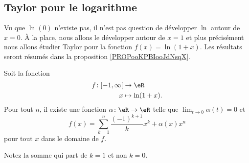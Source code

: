 \subsection{Taylor pour le logarithme}

Vu que \( \ln(0)\) n'existe pas, il n'est pas question de développer \( \ln\) autour de \( x=0\). À la place, nous allons le développer autour de \( x=1\) et plus précisément nous allons étudier Taylor pour la fonction \( f(x)=\ln(1+x)\). Les résultats seront résumés dans la proposition \ref{PROPooKPBIooJdNsqX}.

\begin{proposition}     \label{PROPooWCUEooJudkCV}
    Soit la fonction
    \begin{equation}
        \begin{aligned}
        f\colon \mathopen] -1 , \infty \mathclose[&\to \eR \\
            x&\mapsto \ln(1+x). 
        \end{aligned}
    \end{equation}
    Pour tout \( n\), il existe une fonction \( \alpha\colon \eR\to \eR\) telle que \( \lim_{t\to 0} \alpha(t)=0\) et
    \begin{equation}
        f(x)=\sum_{k=1}^n\frac{ (-1)^{k+1} }{ k }x^k+\alpha(x)x^n
    \end{equation}
    pour tout \( x\) dans le domaine de \( f\).

    Notez la somme qui part de \( k=1\) et non \( k=0\).
\end{proposition}

